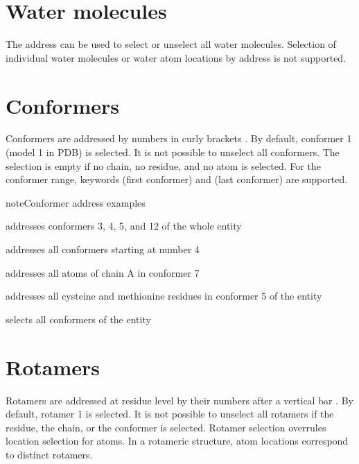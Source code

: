 \documentclass[letterpaper,10pt,english]{sphinxmanual}
\begin{document}
\section{Water molecules}
\label{\detokenize{object_access:water-molecules}}
The address  can be used to select or unselect all water molecules. Selection of individual water molecules or water atom locations by address is not supported.


\section{Conformers}
\label{\detokenize{object_access:conformers}}
Conformers are addressed by numbers in curly brackets \sphinxcode{\sphinxupquote{\{\}}}. By default, conformer 1 (model 1 in PDB) is selected. It is not possible to unselect all conformers.
The selection is empty if no chain, no residue, and no atom is selected. For the conformer range, keywords  (first conformer) and  (last conformer) are supported.

\begin{sphinxadmonition}{note}{Conformer address examples}

  addresses conformers 3, 4, 5, and 12 of the whole entity

 addresses all conformers starting at number 4

 addresses all  atoms of chain A in conformer 7

 addresses all cysteine and methionine residues in conformer 5 of the entity

\sphinxcode{\sphinxupquote{\{*\}}} selects all conformers of the entity
\end{sphinxadmonition}


\section{Rotamers}
\label{\detokenize{object_access:rotamers}}
Rotamers are addressed at residue level by their numbers after a vertical bar \sphinxcode{\sphinxupquote{|}}.
By default, rotamer 1 is selected. It is not possible to unselect all rotamers if the residue, the chain, or the conformer is selected.
Rotamer selection overrules location selection for atoms. In a rotameric structure, atom locations correspond to distinct rotamers.
\end{document}
